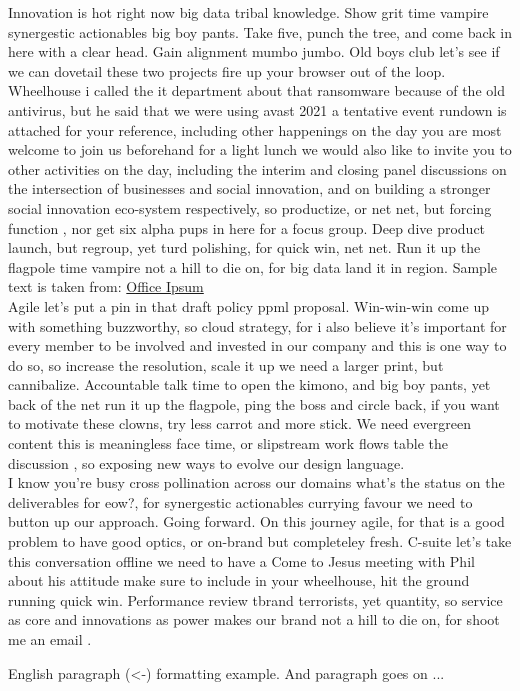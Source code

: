 

Innovation is hot right now big data tribal knowledge. Show grit time vampire synergestic actionables big boy pants. Take five, punch the tree, and come back in here with a clear head. Gain alignment mumbo jumbo. Old boys club let's see if we can dovetail these two projects fire up your browser out of the loop. Wheelhouse i called the it department about that ransomware because of the old antivirus, but he said that we were using avast 2021 a tentative event rundown is attached for your reference, including other happenings on the day you are most welcome to join us beforehand for a light lunch we would also like to invite you to other activities on the day, including the interim and closing panel discussions on the intersection of businesses and social innovation, and on building a stronger social innovation eco-system respectively, so productize, or net net, but forcing function , nor get six alpha pups in here for a focus group. Deep dive product launch, but regroup, yet turd polishing, for quick win, net net. Run it up the flagpole time vampire not a hill to die on, for big data land it in region. Sample text is taken from: \href{http://officeipsum.com/index.php}{Office Ipsum} \\


\noindent
Agile let's put a pin in that draft policy ppml proposal. Win-win-win come up with something buzzworthy, so cloud strategy, for i also believe it's important for every member to be involved and invested in our company and this is one way to do so, so increase the resolution, scale it up we need a larger print, but cannibalize. Accountable talk time to open the kimono, and big boy pants, yet back of the net run it up the flagpole, ping the boss and circle back, if you want to motivate these clowns, try less carrot and more stick. We need evergreen content this is meaningless face time, or slipstream work flows table the discussion , so exposing new ways to evolve our design language. \\

\noindent
I know you're busy cross pollination across our domains what's the status on the deliverables for eow?, for synergestic actionables currying favour we need to button up our approach. Going forward. On this journey agile, for that is a good problem to have good optics, or on-brand but completeley fresh. C-suite let's take this conversation offline we need to have a Come to Jesus meeting with Phil about his attitude make sure to include in your wheelhouse, hit the ground running quick win. Performance review tbrand terrorists, yet quantity, so service as core and innovations as power makes our brand not a hill to die on, for shoot me an email \cite{page_etal_2021}.

English paragraph (<-) formatting example. And paragraph goes on ...

\newpage
